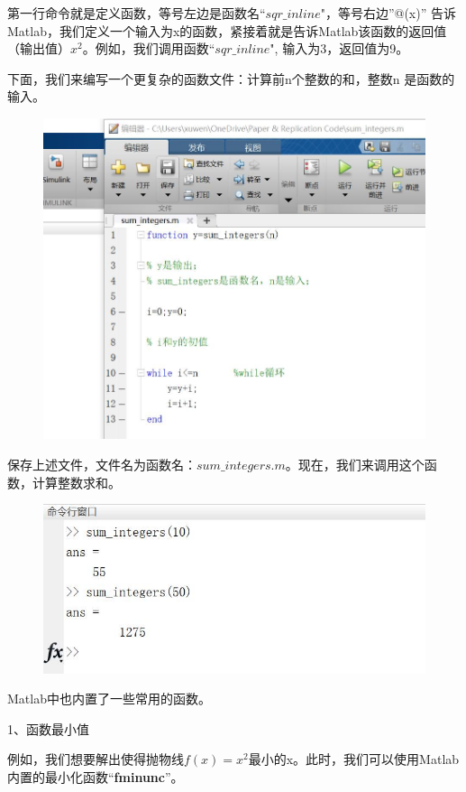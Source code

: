 \documentclass[10pt,math=newtx,citestyle=gb7714-2015,bibstyle=gb7714-2015]{elegantbook}
\begin{document}
{{{	第一行命令就是定义函数，等号左边是函数名“$sqr\_inline$"，等号右边”@(x)” 告诉Matlab，我们定义一个输入为x的函数，紧接着就是告诉Matlab该函数的返回值（输出值）$x^2$。例如，我们调用函数“$sqr\_inline$", 输入为3，返回值为9。
	
	下面，我们来编写一个更复杂的函数文件：计算前n个整数的和，整数n 是函数的输入。
	
	\begin{figure}[htbp!]
		\centering
		\includegraphics[width=0.8\linewidth]{FIG/sumintegers}
		\centering
	\end{figure}
	
	保存上述文件，文件名为函数名：$sum\_integers.m$。现在，我们来调用这个函数，计算整数求和。
	
	\begin{figure}[htbp!]
		\centering
		\includegraphics[width=0.8\linewidth]{FIG/sumintegersresults}
		\centering
	\end{figure}
	
	Matlab中也内置了一些常用的函数。
	
	1、函数最小值
	
	例如，我们想要解出使得抛物线$f(x)=x^2$最小的x。此时，我们可以使用Matlab 内置的最小化函数“\textbf{fminunc}”。
	
}}}
\end{document}
